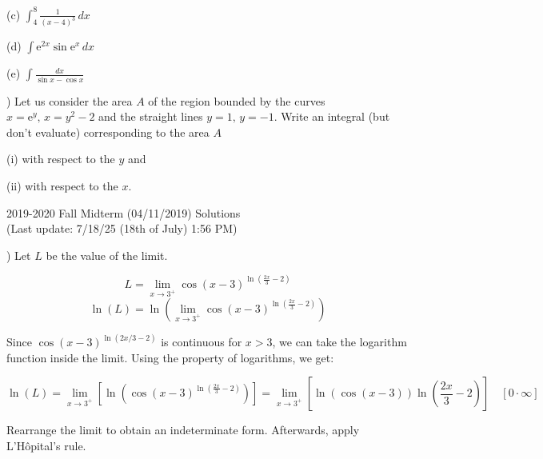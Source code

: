 \documentclass{article}
\begin{document}
\hfill

\noindent (c) $\displaystyle \int_4^8 \frac{1}{(x-4)^3}\, dx$

\hfill

\noindent (d) $\displaystyle \int\mathrm{e}^{2x}\sin \mathrm{e}^x\,dx$

\hfill

\noindent (e) $\displaystyle \int\frac{dx}{\sin x - \cos x}$

\hfill

) Let us consider the area $A$ of the region bounded by the curves $x=\mathrm{e}^y, \, x=y^2-2$ and the straight lines $y=1, \, y=-1$. Write an integral (but don't evaluate) corresponding to the area $A$

\hfill

\noindent (i) with respect to the $y$ and

\noindent (ii) with respect to the $x$.

\newpage

\begin{center}
2019-2020 Fall Midterm (04/11/2019) Solutions\\
(Last update: 7/18/25 (18th of July) 1:56 PM)
\end{center}

) Let $L$ be the value of the limit.

\begin{equation*} L = \lim_{x\to3^+}\cos(x-3)^{\ln\left(\frac{2x}{3}-2\right)}\end{equation*}
\begin{equation*}\ln(L) =\ln\left( \lim_{x\to3^+}\cos(x-3)^{\ln\left(\frac{2x}{3}-2\right)}\right)\end{equation*}

\hfill

\noindent Since $\cos(x-3)^{\ln(2x/3 -2)}$ is continuous for $x>3$, we can take the logarithm function inside the limit. Using the property of logarithms, we get:

\begin{equation*}\ln(L) =\lim_{x\to3^+}\left[ \ln\left(\cos(x-3)^{\ln\left(\frac{2x}{3}-2\right)}\right)\right] = \lim_{x\to3^+}\left[ \ln\left(\cos(x-3)\right)\ln\left(\frac{2x}{3}-2\right)\right]\quad[0 \cdot \infty] \end{equation*}

\hfill

\noindent Rearrange the limit to obtain an indeterminate form. Afterwards, apply L'Hôpital's rule.
\end{document}
